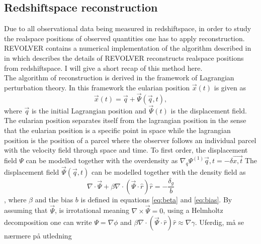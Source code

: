 \subsection{Redshiftspace reconstruction}
Due to all observational data being measured in redshiftspace, in order to study
the realspace positions of observed quantities one has to apply reconstruction. REVOLVER contains a numerical implementation of
the algorithm described in \cite{Nadathur_2018} in which describes the details
of REVOLVER reconstructs realspace positions from redshiftspace. I will give a
short recap of this method here.\\\indent
The algorithm of reconstruction is derived in the framework of Lagrangian
perturbation theory. In this framework the eularian position $\vec{x}(t)$ is
given as
\begin{equation}
    \vec{x}(t)=\vec{q}+\vec{\Psi}(\vec{q},t),
\end{equation}
where $\vec{q}$ is the initial Lagrangian position and $\vec{\Psi}(t)$ is the
displacement field. The eularian position separates itself from the lagrangian
position in the sense that the eularian position is a specific point in space
while the lagrangian position is the position of a parcel where the observer
follows an individual parcel with the velocity field through space and time.
To first order, the displacement field $\Psi$ can be modelled together with the
overdensity as $\nabla_q\Psi^{(1)}{\vec{q},t}=-\delta{\vec{x,t}}$
The displacement field $\vec{\Psi}(\vec{q},t)$ can be modelled together with the
density field as
\begin{equation}
    \nabla\cdot\vec{\Psi}+\beta\nabla\cdot(\vec{\Psi}\cdot\hat{r})\hat{r}=-\frac{\delta_g}{b}
\end{equation}
\cite{recondisplace}, where $\beta$ and the bias $b$ is defined in equations
\ref{eq:beta} and \ref{eq:bias}. By assuming that $\vec{\Psi}$, is irrotational
meaning $\nabla\times\vec{\Psi}=0$, using a Helmholtz decomposition one can
write $\Psi=\nabla\phi$ and
$\beta\nabla\cdot(\vec{\Psi}\cdot\hat{r})\hat{r}\approx\nabla\gamma$.
Uferdig, må se nærmere på utledning